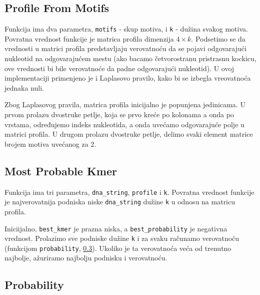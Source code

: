 


\subsection{Profile From Motifs}
\label{profileFromMotifs}

Funkcija ima dva parametra, \texttt{motifs} - skup motiva, i \texttt{k} - dužina svakog motiva. Povratna vrednost funkcije je matrica profila dimenzija $4 \times k$. Podsetimo se da vrednosti u matrici profila predstavljaju verovatnoću da se pojavi odgovarajući nukleotid na odgovarajućem mestu (ako bacamo četvorostranu pristrasnu kockicu, ove vrednosti bi bile verovatnoće da padne odgovarajući nukleotid). U ovoj implementaciji primenjeno je i Laplasovo pravilo, kako bi se izbegla vreovatnoća jednaka nuli.


Zbog Laplasovog pravila, matrica profila inicijalno je popunjena jedinicama. U prvom prolazu dvostruke petlje, koja se prvo kreće po kolonama a onda po vrstama, određujemo indeks nukleotida, a onda uvećamo odgovarajuće polje u matrici profila. U drugom prolazu dvostruke petlje, delimo svaki element matrice brojem motiva uvećanog za 2.





\subsection{Most Probable Kmer}
\label{mostProbableKmer}

Funkcija ima tri parametra, \texttt{dna\_string}, \texttt{profile} i \texttt{k}. Povratna vrednost funkcije je najverovatnija podniska niske \texttt{dna\_string} dužine \texttt{k} u odnosu na matricu profila.

Iniciijalno, \texttt{best\_kmer} je prazna niska, a \texttt{best\_probability} je negativna vrednost. Prolazimo sve podniske dužine \texttt{k} i za svaku računamo verovatnoću (funkcijom \texttt{probability}, \ref{probability}). Ukoliko je ta verovatnoća veća od trenutno najbolje, ažuriramo najbolju podnisku i verovatnoću.




\subsection{Probability}
\label{probability}

